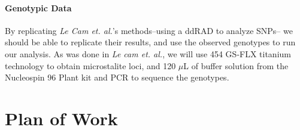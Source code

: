 \documentclass[12pt]{extarticle}
\begin{document}
\paragraph{Genotypic Data}
By replicating \textit{Le Cam et. al.}'s methods--using a ddRAD to analyze SNPs-- we should be able to replicate their results, and use the observed genotypes to run our analysis. As was done in \textit{Le cam et. al.}, we will use 454 GS‐FLX titanium technology to obtain microstalite loci, and 120 $\mu$L of buffer solution from the Nucleospin 96 Plant kit and PCR to sequence the genotypes.
\section{Plan of Work}


\FloatBarrier


\end{document}
